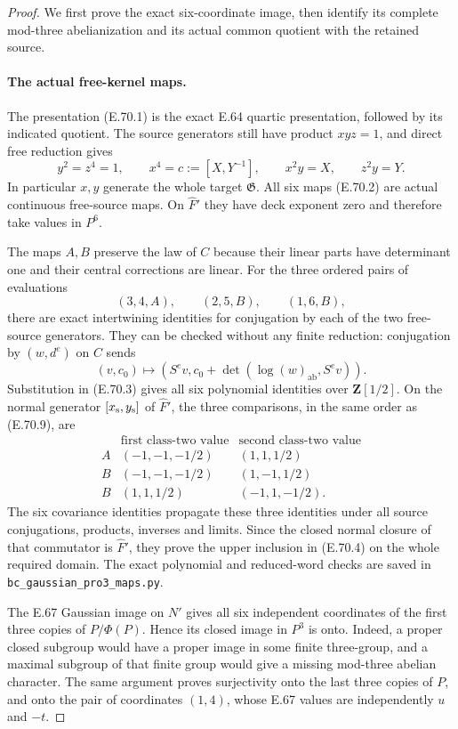 \begin{proof}
We first prove the exact six-coordinate image, then
identify its complete mod-three abelianization and
its actual common quotient with the retained source.

\paragraph{The actual free-kernel maps.}
The presentation (E.70.1) is the exact E.64 quartic
presentation, followed by its indicated quotient.
The source generators still have product $xyz=1$,
and direct free reduction gives
\[
 y^2=z^4=1,\qquad x^4=c:=[X,Y^{-1}],\qquad
 x^2y=X,\qquad z^2y=Y.
 \tag{E.70.8}
\]
In particular $x,y$ generate the whole target
$\mathfrak G$. All six maps (E.70.2) are actual
continuous free-source maps. On $\widehat F'$ they
have deck exponent zero and therefore take values
in $P^6$.

The maps $A,B$ preserve the law of $C$ because
their linear parts have determinant one and their
central corrections are linear. For the three
ordered pairs of evaluations
\[
          (3,4,A),\qquad(2,5,B),\qquad(1,6,B),
 \tag{E.70.9}
\]
there are exact intertwining identities for
conjugation by each of the two free-source
generators. They can be checked without any
finite reduction: conjugation by $(w,d^e)$ on $C$
sends
\[
 (v,c_0)\longmapsto
      (S^ev,c_0+\det(\log(w)_{\mathrm{ab}},S^ev)).
 \tag{E.70.10}
\]
Substitution in (E.70.3) gives all six polynomial
identities over $\mathbf Z[1/2]$. On the normal
generator $[x_{\rm s},y_{\rm s}]$ of $\widehat F'$,
the three comparisons, in the same order as
(E.70.9), are
\[
 \begin{array}{c|c|c}
 &\text{first class-two value}&\text{second class-two value}\\ \hline
 A&(-1,-1,-1/2)&(1,1,1/2)\\
 B&(-1,-1,-1/2)&(1,-1,1/2)\\
 B&(1,1,1/2)&(-1,1,-1/2).
 \end{array}
 \tag{E.70.11}
\]
The six covariance identities propagate these three
identities under all source conjugations, products,
inverses and limits. Since the closed normal closure
of that commutator is $\widehat F'$, they prove the
upper inclusion in (E.70.4) on the whole required
domain. The exact polynomial and reduced-word
checks are saved in \texttt{bc\_gaussian\_pro3\_maps.py}.

The E.67 Gaussian image on $N'$ gives all six
independent coordinates of the first three copies
of $P/\Phi(P)$. Hence its closed image in $P^3$
is onto. Indeed, a proper closed subgroup would
have a proper image in some finite three-group,
and a maximal subgroup of that finite group would
give a missing mod-three abelian character.
The same argument proves surjectivity onto the
last three copies of $P$, and onto the pair of
coordinates $(1,4)$, whose E.67 values are
independently $u$ and $-t$.


\end{proof}
